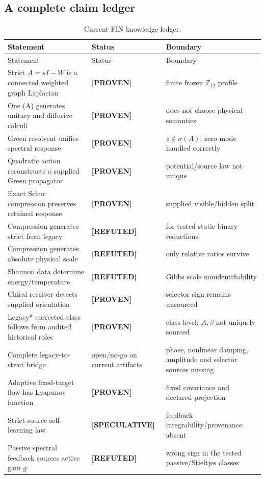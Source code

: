 \documentclass[11pt,a4paper]{article}
\theoremstyle{definition}
\theoremstyle{remark}
\newcommand{\Z}{\mathbb Z}
\newcommand{\status}[2]{\textcolor{#1}{\textbf{[#2]}}}
\newcommand{\proven}{\status{fingreen}{PROVEN}}
\newcommand{\speculative}{\status{finpurple}{SPECULATIVE}}
\newcommand{\refuted}{\status{finred}{REFUTED}}
\begin{document}
\subsection{A complete claim ledger}

\begin{longtable}{@{}p{}p{}p{}@{}}
\caption{Current FIN knowledge ledger.}\\
\toprule
Statement & Status & Boundary\\
\midrule
\endfirsthead
\toprule
Statement & Status & Boundary\\
\midrule
\endhead
Strict $A=sI-W$ is a connected weighted graph Laplacian & \proven & finite frozen $\Z_{12}$ profile\\
One (A) generates unitary and diffusive calculi & \proven & does not choose physical semantics\\
Green resolvent unifies spectral response & \proven & $z\notin\sigma(A)$; zero mode handled correctly\\
Quadratic action reconstructs a supplied Green propagator & \proven & potential/source law not unique\\
Exact Schur compression preserves retained response & \proven & supplied visible/hidden split\\
Compression generates strict from legacy & \refuted & for tested static binary reductions\\
Compression generates absolute physical scale & \refuted & only relative ratios survive\\
Shannon data determine energy/temperature & \refuted & Gibbs scale nonidentifiability\\
Chiral receiver detects supplied orientation & \proven & selector sign remains unsourced\\
Legacy* corrected class follows from audited historical roles & \proven & class-level; $A,\beta$ not uniquely sourced\\
Complete legacy-to-strict bridge & open/no-go on current artifacts & phase, nonlinear damping, amplitude and selector sources missing\\
Adaptive fixed-target flow has Lyapunov function & \proven & fixed covariance and declared projection\\
Strict-source self-learning law & \speculative & feedback integrability/provenance absent\\
Passive spectral feedback sources active gain $g$ & \refuted & wrong sign in the tested passive/Stieltjes classes\\

\end{longtable}
\end{document}
